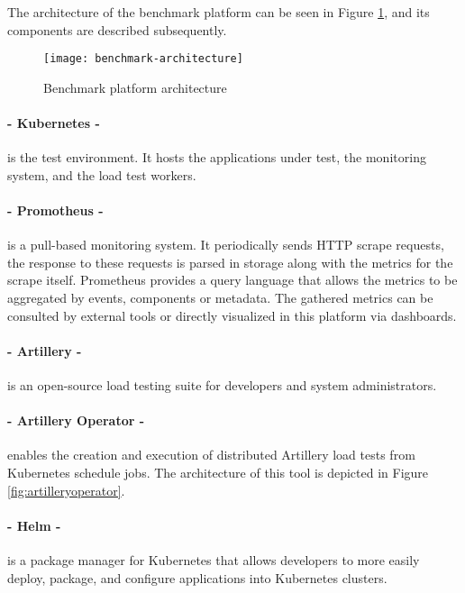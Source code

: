 The architecture of the benchmark platform can be seen in Figure \ref{fig:benchmarkarchitecture}, and its components are described subsequently.

\begin{figure}[htbp]
    \centering
    \centerline{\texttt{[image: benchmark-architecture]}}
    \caption{Benchmark platform architecture}
    \label{fig:benchmarkarchitecture}
\end{figure}

\paragraph{- Kubernetes \cite{kubernetes} -} is the test environment.
It hosts the applications under test, the monitoring system, and the load test workers.

\paragraph{- Promotheus \cite{turnbull2018monitoring} -} is a pull-based monitoring system.
It periodically sends HTTP scrape requests, the response to these requests is parsed in storage along with the metrics for the scrape itself.
Prometheus provides a query language that allows the metrics to be aggregated by events, components or metadata.
The gathered metrics can be consulted by external tools or directly visualized in this platform via dashboards.

\paragraph{- Artillery \cite{artillery} -}
is an open-source load testing suite for developers and system administrators.

\paragraph{- Artillery Operator \cite{artilleryop} -}
enables the creation and execution of distributed Artillery load tests from Kubernetes schedule jobs.
The architecture of this tool is depicted in Figure \ref{fig:artilleryoperator}.

\paragraph{- Helm \cite{helm} -}
is a package manager for Kubernetes that allows developers to more easily deploy, package, and configure applications into Kubernetes clusters.

